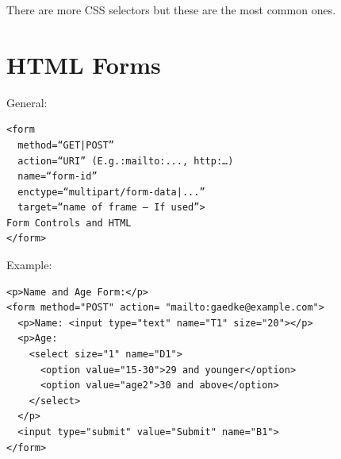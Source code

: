 \documentclass[11pt]{article}
\begin{document}
There are more CSS selectors but these are the most common ones.
\section{HTML Forms}
\label{sec:orgb8d60d7}
General:
\lstset{breaklines=true,language=HTML,label= ,caption= ,captionpos=b,numbers=none}
\begin{lstlisting}
<form
  method=“GET|POST”
  action=“URI” (E.g.:mailto:..., http:…)
  name=“form-id”
  enctype=“multipart/form-data|...”
  target=“name of frame – If used”>
Form Controls and HTML
</form>
\end{lstlisting}
Example:
\lstset{breaklines=true,language=HTML,label= ,caption= ,captionpos=b,numbers=none}
\begin{lstlisting}
<p>Name and Age Form:</p>
<form method="POST" action= "mailto:gaedke@example.com">
  <p>Name: <input type="text" name="T1" size="20"></p>
  <p>Age:
    <select size="1" name="D1">
      <option value="15-30">29 and younger</option>
      <option value="age2">30 and above</option>
    </select>
  </p>
  <input type="submit" value="Submit" name="B1">
</form>
\end{lstlisting}
\end{document}
